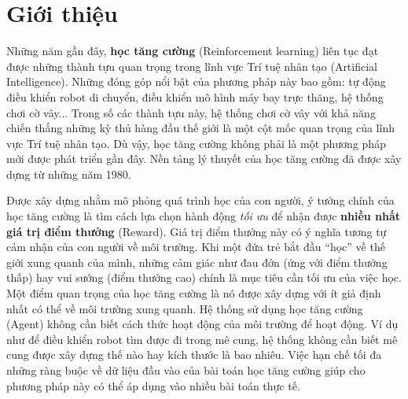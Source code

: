 \chapter{Giới thiệu}

\ifpdf
\graphicspath{{Chapter1/Chapter1Figs/PNG/}{Chapter1/Chapter1Figs/PDF/}{Chapter1/Chapter1Figs/}}
\else
\graphicspath{{Chapter1/Chapter1Figs/EPS/}{Chapter1/Chapter1Figs/}}
\fi

Những năm gần đây, \textbf{học tăng cường} (Reinforcement learning) liên tục đạt được những thành tựu quan trọng trong lĩnh vực Trí tuệ nhân tạo (Artificial Intelligence). 
Những đóng góp nổi bật của phương pháp này bao gồm: tự động điều khiển robot di chuyển, điều khiển mô hình máy bay trực thăng, hệ thống chơi cờ vây... 
Trong số các thành tựu này, hệ thống chơi cờ vây với khả năng chiến thắng những kỳ thủ hàng đầu thế giới là một cột mốc quan trọng của lĩnh vực Trí tuệ nhân tạo. 
Dù vậy, học tăng cường không phải là một phương pháp mới được phát triển gần đây. Nền tảng lý thuyết của học tăng cường đã được xây dựng từ những năm 1980. 

Được xây dựng nhằm mô phỏng quá trình học của con người, ý tưởng chính của học tăng cường là tìm cách lựa chọn hành động \textit{tối ưu} để nhận được \textbf{nhiều nhất giá trị điểm thưởng} (Reward). 
Giá trị điểm thưởng này có ý nghĩa tương tự cảm nhận của con người về môi trường. 
Khi một đứa trẻ bắt đầu ``học'' về thế giới xung quanh của mình, những cảm giác như đau đớn (ứng với điểm thưởng thấp) hay vui sướng (điểm thưởng cao) chính là mục tiêu cần tối ưu của việc học. 
Một điểm quan trọng của học tăng cường là nó được xây dựng với ít giả định nhất có thể về môi trường xung quanh.
Hệ thống sử dụng học tăng cường (Agent) không cần biết cách thức hoạt động của môi trường để hoạt động. 
Ví dụ như để điều khiển robot tìm được đi trong mê cung, hệ thống không cần biết mê cung được xây dựng thế nào hay kích thước là bao nhiêu. 
Việc hạn chế tối đa những ràng buộc về dữ liệu đầu vào của bài toán học tăng cường giúp cho phương pháp này có thể áp dụng vào nhiều bài toán thực tế.


